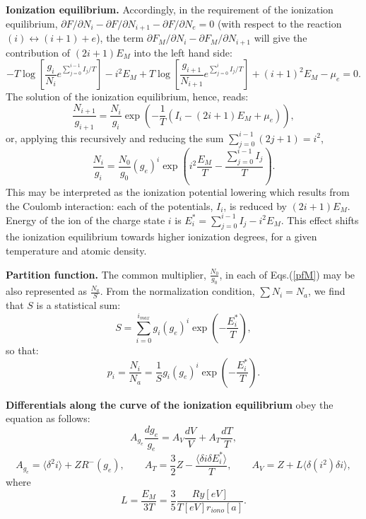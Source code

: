 {\bf Ionization equilibrium.} Accordingly, in the requirement of the ionization equilibrium, $\partial F/\partial N_i - \partial F/\partial N_{i+1} - \partial F/\partial N_e = 0$ (with respect to the reaction $(i)\leftrightarrow(i+1)+e$),
the term $\partial F_{M}/\partial N_i -\partial F_{M}/\partial N_{i+1}$ will 
give the contribution of $(2i+1) E_M$ into the left hand side:
\begin{equation}
-T \log \left[ \frac{g_i}    {N_i}     e^{\sum_{j=0}^{i-1} I_j/T} \right] - i^2 E_M
+T \log \left[ \frac{g_{i+1}}{N_{i+1}} e^{\sum_{j=0}^i     I_j/T} \right] + (i+1)^2 E_M
-\mu_e = 0.
\end{equation}
The solution of the ionization equilibrium, hence, reads:
\begin{equation}
\frac{N_{i+1}}{g_{i+1}} = \frac{N_i}{g_i} \exp\left(-\frac1T \left(I_i - (2i+1) E_M + \mu_e \right)\right),
\end{equation}
or, applying this recursively and reducing the sum $\sum_{j=0}^{i-1} (2j+1) = i^2$,
\begin{equation}\label{pfM}
\frac{N_i}{g_i}=\frac{N_0}{g_0}(g_e)^i \exp \left( i^2 \frac{E_M}{T} -\frac{\sum_{j=0}^{i-1}I_j}T \right) .
\end{equation}
This may be interpreted as the ionization potential lowering which results from the Coulomb interaction:
each of the potentials, $I_i$, is reduced by $(2i+1)E_M$.
Energy of the ion of the charge state $i$ is $E_i^* = \sum_{j=0}^{i-1}I_j - i^2 E_M$.
This effect shifts the ionization equilibrium towards higher ionization degrees, for a given temperature and atomic density.

{\bf Partition function.} The common multiplier, $\frac{N_0}{g_0}$, in each of Eqs.(\ref{pfM}) may be also represented as $\frac{N_a}{S}$.
From the normalization condition, $\sum N_i = N_a$, we find that $S$ is a statistical sum:
\begin{equation}\label{MadS}
S=\sum_{i=0}^{i_{max}} g_i (g_e)^i \exp\left(-\frac{E_i^*}T\right),
\end{equation}
so that:
\begin{equation}\label{ni}
p_i = \frac{N_i}{N_a} = \frac{1}S g_i (g_e)^i \exp \left( -\frac{E_i^*}T \right).
\end{equation}

{\bf Differentials along the curve of the ionization equilibrium} obey the equation as follows:
\begin{equation}\label{diffstruct}
A_{g_e} \frac{dg_e}{g_e} = A_V \frac{dV}{V} + A_T \frac{dT}{T},
\end{equation}
\begin{equation}
A_{g_e} = \langle \delta^2 i \rangle + ZR^-(g_e), \qquad
A_T     = \frac32 Z - \frac{\langle \delta i \delta E^*_i \rangle}{T}, \qquad
A_V     = Z + L \langle \delta(i^2) \delta i \rangle,
\end{equation}
where 
\begin{equation}
L   = \frac{E_M}{3T} = \frac35 \frac{Ry[eV]}{T[eV] r_{iono}[a]}.
\end{equation}

